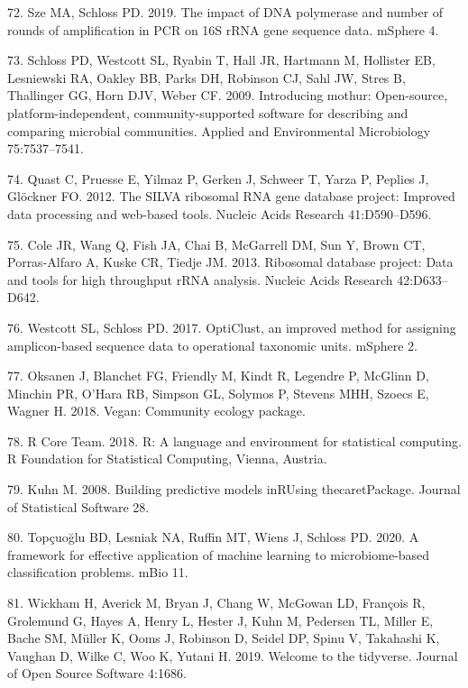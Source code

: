 \documentclass[11pt,]{article}
\begin{document}
\hypertarget{ref-Sze2019}{}
72. Sze MA, Schloss PD. 2019. The impact of DNA polymerase and number of
rounds of amplification in PCR on 16S rRNA gene sequence data. mSphere
4.

\hypertarget{ref-Schloss2009}{}
73. Schloss PD, Westcott SL, Ryabin T, Hall JR, Hartmann M, Hollister
EB, Lesniewski RA, Oakley BB, Parks DH, Robinson CJ, Sahl JW, Stres B,
Thallinger GG, Horn DJV, Weber CF. 2009. Introducing mothur:
Open-source, platform-independent, community-supported software for
describing and comparing microbial communities. Applied and
Environmental Microbiology 75:7537--7541.

\hypertarget{ref-Quast2012}{}
74. Quast C, Pruesse E, Yilmaz P, Gerken J, Schweer T, Yarza P, Peplies
J, Glöckner FO. 2012. The SILVA ribosomal RNA gene database project:
Improved data processing and web-based tools. Nucleic Acids Research
41:D590--D596.

\hypertarget{ref-Cole2013}{}
75. Cole JR, Wang Q, Fish JA, Chai B, McGarrell DM, Sun Y, Brown CT,
Porras-Alfaro A, Kuske CR, Tiedje JM. 2013. Ribosomal database project:
Data and tools for high throughput rRNA analysis. Nucleic Acids Research
42:D633--D642.

\hypertarget{ref-Westcott2017}{}
76. Westcott SL, Schloss PD. 2017. OptiClust, an improved method for
assigning amplicon-based sequence data to operational taxonomic units.
mSphere 2.

\hypertarget{ref-Vegan2018}{}
77. Oksanen J, Blanchet FG, Friendly M, Kindt R, Legendre P, McGlinn D,
Minchin PR, O'Hara RB, Simpson GL, Solymos P, Stevens MHH, Szoecs E,
Wagner H. 2018. Vegan: Community ecology package.

\hypertarget{ref-r_citation_2018}{}
78. R Core Team. 2018. R: A language and environment for statistical
computing. R Foundation for Statistical Computing, Vienna, Austria.

\hypertarget{ref-Kuhn2008}{}
79. Kuhn M. 2008. Building predictive models inRUsing thecaretPackage.
Journal of Statistical Software 28.

\hypertarget{ref-Topcuoglu2020}{}
80. Topçuoğlu BD, Lesniak NA, Ruffin MT, Wiens J, Schloss PD. 2020. A
framework for effective application of machine learning to
microbiome-based classification problems. mBio 11.

\hypertarget{ref-Tidyverse2019}{}
81. Wickham H, Averick M, Bryan J, Chang W, McGowan LD, François R,
Grolemund G, Hayes A, Henry L, Hester J, Kuhn M, Pedersen TL, Miller E,
Bache SM, Müller K, Ooms J, Robinson D, Seidel DP, Spinu V, Takahashi K,
Vaughan D, Wilke C, Woo K, Yutani H. 2019. Welcome to the tidyverse.
Journal of Open Source Software 4:1686.
\end{document}
